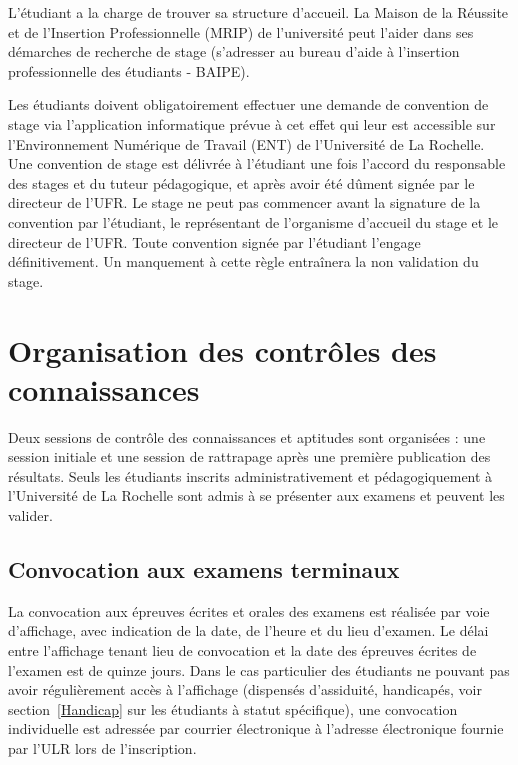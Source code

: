 \documentclass[a4paper,11pt]{article}
\begin{document}
L'étudiant a la charge de trouver sa structure d'accueil. La Maison de la Réussite et de l'Insertion Professionnelle (MRIP) de l'université peut l'aider dans ses démarches de recherche de stage (s'adresser au bureau d'aide à l'insertion professionnelle des étudiants - BAIPE).

Les étudiants doivent obligatoirement effectuer une demande de convention de stage via l'application informatique prévue à cet effet qui leur est accessible sur l'Environnement Numérique de Travail (ENT) de l'Université de La Rochelle.
Une convention de stage est délivrée à l'étudiant une fois l'accord du responsable des stages et du tuteur pédagogique, et après avoir été dûment signée par le directeur de l'UFR.
Le stage ne peut pas commencer avant la signature de la convention par l'étudiant, le représentant de l'organisme d'accueil du stage et le directeur de l'UFR.
Toute convention signée par l'étudiant l'engage définitivement. Un manquement à cette règle entraînera la non validation du stage.

\section{Organisation des contrôles des connaissances}\label{cc}

Deux sessions de contrôle des connaissances et aptitudes sont organisées : une session initiale et une session de rattrapage après une première publication des résultats. Seuls les étudiants inscrits administrativement et pédagogiquement à l'Université de La Rochelle sont admis à se présenter aux examens et peuvent les valider.

\subsection{Convocation aux examens terminaux}\label{exam}
La convocation aux épreuves écrites et orales des examens est réalisée par voie d'affichage, avec indication de la date, de l'heure et du lieu d'examen. Le délai entre l'affichage tenant lieu de convocation et la date des épreuves écrites de l'examen est de quinze jours.
Dans le cas particulier des étudiants ne pouvant pas avoir régulièrement accès à l'affichage (dispensés d'assiduité, handicapés, voir section~\ref{Handicap} sur les étudiants à statut spécifique), une convocation individuelle est adressée par courrier électronique à l'adresse électronique fournie par l'ULR lors de l'inscription.
\end{document}
